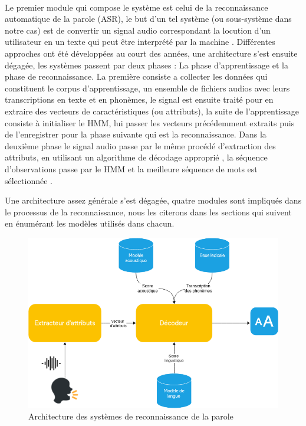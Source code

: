 	\paragraph{}
	Le premier module qui compose le système est celui de la reconnaissance automatique de la parole (ASR), le but d'un tel système (ou sous-système dans notre cas) est de convertir un signal audio correspondant la locution d'un utilisateur en un texte qui peut être interprété par la machine \cite{asr_definition}. Différentes approches ont été développées au court des années, une architecture s'est ensuite dégagée, les systèmes passent par deux phases : La phase d'apprentissage et la phase de reconnaissance. La première consiste a collecter les données qui constituent le corpus d'apprentissage, un ensemble de fichiers audios avec leurs transcriptions en texte et en phonèmes, le signal est ensuite traité pour en extraire des vecteurs de caractéristiques (ou attributs), la suite de l'apprentissage consiste à initialiser le HMM, lui passer les vecteurs précédemment extraits puis de l'enregistrer pour la phase suivante qui est la reconnaissance. Dans la deuxième phase le signal audio passe par le même procédé d'extraction des attributs, en utilisant un algorithme de décodage approprié \cite{viterbi_hmm}, la séquence d'observations passe par le HMM et la meilleure séquence de mots est sélectionnée \cite{speech_reco_Yu2015}.
	\par Une architecture assez générale s'est dégagée, quatre modules sont impliqués dans le processus de la reconnaissance, nous les citerons dans les sections qui suivent en énumérant les modèles utilisés dans chacun.
	
	\begin{figure}[H]
		\centering
		\label{ASR_schema}
		\includegraphics[width=0.60\linewidth]{images/ASR/schema.png}
		\caption{Architecture des systèmes de reconnaissance de la parole \cite{speech_reco_Yu2015}}
	\end{figure}
	
